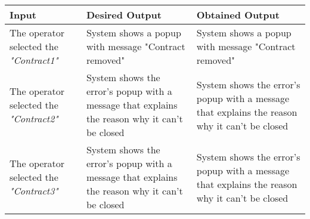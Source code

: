 {{{			\begin{table}[h]
			\begin{tabular}{|p{4cm}|p{5cm}|p{5cm}|}
			\hline
			\centering \vspace{1mm} \bfseries{Input} \vspace{1mm} & \vspace{1mm} \bfseries{Desired Output} \vspace{1mm} & \vspace{1mm} \bfseries{Obtained Output} \vspace{1mm}\\
			\hline
				\vspace{1mm} The operator selected the \itshape{"Contract1"} \vspace{1mm} &
				\vspace{1mm} System shows a popup with message "Contract removed" \vspace{1mm} & 
				\vspace{1mm} System shows a popup with message "Contract removed" \vspace{1mm} \\
			\hline
				\vspace{1mm} The operator selected the \itshape{"Contract2"} \vspace{1mm} &
				\vspace{1mm} System shows the error's popup with a message that explains the reason why it can't be closed \vspace{1mm} & 
				\vspace{1mm} System shows the error's popup with a message that explains the reason why it can't be closed \vspace{1mm} \\
			\hline
				\vspace{1mm} The operator selected the \itshape{"Contract3"} \vspace{1mm} &
				\vspace{1mm} System shows the error's popup with a message that explains the reason why it can't be closed \vspace{1mm} & 
				\vspace{1mm} System shows the error's popup with a message that explains the reason why it can't be closed \vspace{1mm} \\
			\hline
			\end{tabular}
			\end{table}
		}
		\clearpage

}}
